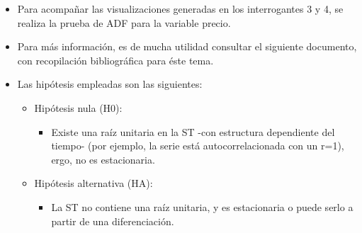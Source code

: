 \documentclass[11pt]{article}
\providecommand{\tightlist}{%
      \setlength{\itemsep}{0pt}\setlength{\parskip}{0pt}}
\begin{document}
    
    \begin{itemize}
\item
  Para acompañar las visualizaciones generadas en los interrogantes 3 y
  4, se realiza la prueba de ADF para la variable precio.
\item
  Para más información, es de mucha utilidad consultar el siguiente
  documento, con recopilación bibliográfica para éste tema.
\item
  Las hipótesis empleadas son las siguientes:

  \begin{itemize}
  \tightlist
  \item
    Hipótesis nula (H0):

    \begin{itemize}
    \tightlist
    \item
      Existe una raíz unitaria en la ST -con estructura dependiente del
      tiempo- (por ejemplo, la serie está autocorrelacionada con un
      r=1), ergo, no es estacionaria.
    \end{itemize}
  \item
    Hipótesis alternativa (HA):

    \begin{itemize}
    \tightlist
    \item
      La ST no contiene una raíz unitaria, y es estacionaria o puede
      serlo a partir de una diferenciación.
    \end{itemize}
  \end{itemize}
\end{itemize}
\end{document}

